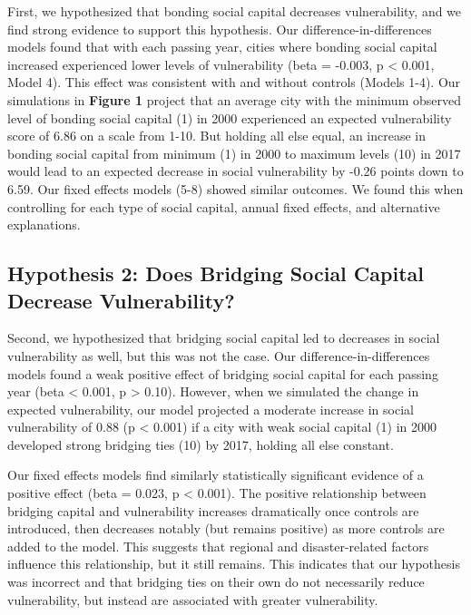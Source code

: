 \documentclass[]{elsarticle} %
\begin{document}
First, we hypothesized that bonding social capital decreases
vulnerability, and we find strong evidence to support this hypothesis.
Our difference-in-differences models found that with each passing year,
cities where bonding social capital increased experienced lower levels
of vulnerability (beta = -0.003, p \textless{} 0.001, Model 4). This
effect was consistent with and without controls (Models 1-4). Our
simulations in \textbf{Figure 1} project that an average city with the
minimum observed level of bonding social capital (1) in 2000 experienced
an expected vulnerability score of 6.86 on a scale from 1-10. But
holding all else equal, an increase in bonding social capital from
minimum (1) in 2000 to maximum levels (10) in 2017 would lead to an
expected decrease in social vulnerability by -0.26 points down to 6.59.
Our fixed effects models (5-8) showed similar outcomes. We found this
when controlling for each type of social capital, annual fixed effects,
and alternative explanations.

\hypertarget{hypothesis-2-does-bridging-social-capital-decrease-vulnerability}{%
\subsection{Hypothesis 2: Does Bridging Social Capital Decrease
Vulnerability?}\label{hypothesis-2-does-bridging-social-capital-decrease-vulnerability}}

Second, we hypothesized that bridging social capital led to decreases in
social vulnerability as well, but this was not the case. Our
difference-in-differences models found a weak positive effect of
bridging social capital for each passing year (beta \textless{} 0.001, p
\textgreater{} 0.10). However, when we simulated the change in expected
vulnerability, our model projected a moderate increase in social
vulnerability of 0.88 (p \textless{} 0.001) if a city with weak social
capital (1) in 2000 developed strong bridging ties (10) by 2017, holding
all else constant.

Our fixed effects models find similarly statistically significant
evidence of a positive effect (beta = 0.023, p \textless{} 0.001). The
positive relationship between bridging capital and vulnerability
increases dramatically once controls are introduced, then decreases
notably (but remains positive) as more controls are added to the model.
This suggests that regional and disaster-related factors influence this
relationship, but it still remains. This indicates that our hypothesis
was incorrect and that bridging ties on their own do not necessarily
reduce vulnerability, but instead are associated with greater
vulnerability.
\end{document}
